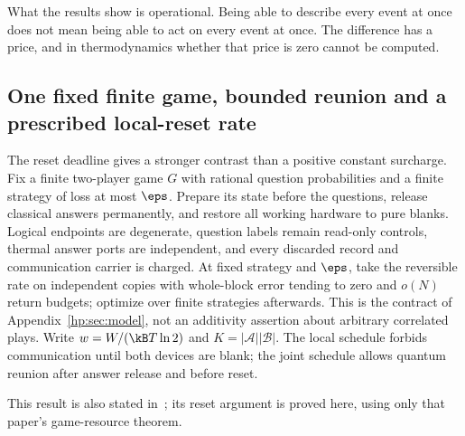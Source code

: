 What the results show is operational. Being able to describe every event at once does not mean being able to act on every event at once. The difference has a price, and in thermodynamics whether that price is zero cannot be computed.


\subsection{One fixed finite game, bounded reunion and a prescribed local-reset rate}\label{sec:precision-headline}
The reset deadline gives a stronger contrast than a positive constant surcharge. Fix a finite two-player game $G$ with rational question probabilities and a finite strategy of loss at most $\eps$. Prepare its state before the questions, release classical answers permanently, and restore all working hardware to pure blanks. Logical endpoints are degenerate, question labels remain read-only controls, thermal answer ports are independent, and every discarded record and communication carrier is charged. At fixed strategy and $\eps$, take the reversible rate on independent copies with whole-block error tending to zero and $o(N)$ return budgets; optimize over finite strategies afterwards. This is the contract of Appendix~\ref{hp:sec:model}, not an additivity assertion about arbitrary correlated plays. Write $w=W/(\kB T\ln2)$ and $K=|\mathcal A||\mathcal B|$. The local schedule forbids communication until both devices are blank; the joint schedule allows quantum reunion after answer release and before reset.

This result is also stated in~\cite[Corollary~13.1]{HPuncomputable}; its reset argument is proved here, using only that paper's game-resource theorem.

